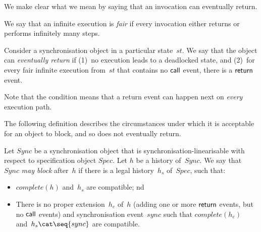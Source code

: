 We make clear what we mean by saying that an invocation can eventually return.
%
\begin{definition}
We say that an infinite execution is \emph{fair} if every invocation either
returns or performs infinitely many steps.

Consider a synchronisation object in a particular state~$st$.  We say that the
object can \emph{eventually return} if (1)~no execution leads to a deadlocked
state, and (2)~for every fair infinite execution
from~$st$ that contains no $\mathsf{call}$ event, there is a $\mathsf{return}$ event.
\end{definition}
%
Note that the condition means that a return event can happen next on
\emph{every} execution path.






The following definition describes the circumstances under which it is
acceptable for an object to block, and so does not eventually return.
%
\begin{definition}
Let $Sync$ be a synchronisation object that is synchronisation-linearisable
with respect to specification object $Spec$.  Let $h$ be a history of~$Sync$.
We say that $Sync$ \emph{may block} after~$h$ if there is a legal
history~$h_s$ of~$Spec$, such that:
%
\begin{itemize}
\item $complete(h)$ and~$h_s$ are compatible; nd

\item There is no proper extension~$h_e$ of~$h$ (adding one or more $\mathsf{return}$
  events, but no $\mathsf{call}$ events) and synchronisation event~$sync$ such that
  $complete(h_e)$ and~$h_s \cat \seq{sync}$ are compatible.
\end{itemize}
\end{definition}

